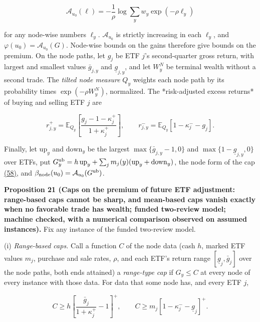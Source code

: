 \documentclass[11pt]{article}
\begin{document}
\begin{equation*}
\mathcal A_{u_0}(\ell)
 =-\frac1\rho\log\sum_yw_y\exp(-\rho\ell_y)\tag{60}\label{eq:60}
\end{equation*}

for any node-wise numbers \(\ell_y\). \(\mathcal A_{u_0}\) is
strictly increasing in each \(\ell_y\), and
\(\varphi(u_0)=\mathcal A_{u_0}(G)\). Node-wise bounds on the
gains therefore give bounds on the premium. On the node paths,
let \(g_j\) be ETF \(j\)'s second-quarter gross return, with
largest and smallest values \(\bar g_{j,y}\) and
\(\underline g_{j,y}\), and let \(W^N_y\) be terminal wealth
without a second trade. The \emph{tilted node measure} \(Q_y\)
weights each node path by its probability times
\(\exp(-\rho W^N_y)\), normalized. The *risk-adjusted excess
returns* of buying and selling ETF \(j\) are

\begin{equation*}
r^+_{j,y}=\mathbb E_{Q_y}\!\left[\frac{g_j-1-\kappa^+_j}
                                  {1+\kappa^+_j}\right],\qquad
r^-_{j,y}=\mathbb E_{Q_y}\!\left[1-\kappa^-_j-g_j\right].
\end{equation*}

Finally, let \(\mathrm{up}_y\) and \(\mathrm{down}_y\) be the
largest \(\max\{\bar g_{j,y}-1,0\}\) and
\(\max\{1-\underline g_{j,y},0\}\) over ETFs, put
\(G^{\rm ub}_y=h\,\mathrm{up}_y+\sum_jm_j(y)
(\mathrm{up}_y+\mathrm{down}_y)\), the node form of the cap
\hyperref[eq:58]{(58)}, and \(\beta_{\rm node}(u_0)=\mathcal A_{u_0}(G^{\rm ub})\).

\label{res:Proposition-21}
\textbf{Proposition 21 (Caps on the premium of future ETF adjustment: range-based caps cannot be sharp, and mean-based caps vanish exactly when no favorable trade has wealth; funded two-review model; machine checked, with a numerical comparison observed on assumed instances).}
Fix any instance of the funded two-review model.

(i) \emph{Range-based caps.} Call a function \(C\) of the node data
(cash \(h\), marked ETF values \(m_j\), purchase and sale rates,
\(\rho\), and each ETF's return range
\([\underline g_j,\bar g_j]\) over the node paths, both ends
attained) a \emph{range-type cap} if \(G_y\leq C\) at every node of
every instance with those data. For data that some node has, and
every ETF \(j\),

\begin{equation*}
C\geq h\left[\frac{\bar g_j}{1+\kappa^+_j}-1\right]^+,
\qquad
C\geq m_j\left[1-\kappa^-_j-\underline g_j\right]^+.\tag{61}\label{eq:61}
\end{equation*}
\end{document}
